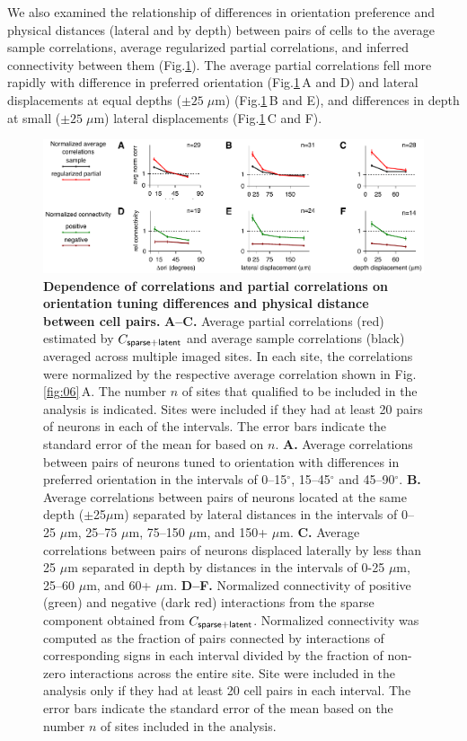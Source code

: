\documentclass[10pt]{article}
\newcommand{\figref}[2]{Fig.\;\ref{fig:#1}\,#2}
\begin{document}
We also examined the relationship of differences in orientation preference and physical distances (lateral and by depth) between pairs of cells to the average sample correlations, average regularized partial correlations, and inferred connectivity between them (Fig.\;\ref{fig:07}). The average partial correlations fell more rapidly with difference in preferred orientation (\figref{07}{A and D}) and lateral displacements at equal depths ($\pm 25\;\mu$m) (\figref{07}{B and E}), and differences in depth at small ($\pm 25\;\mu$m) lateral displacements (\figref{07}{C and F}).

\begin{figure}[!ht]
    \begin{center}
        \includegraphics{./figures/Figure07.pdf}
    \end{center}
    \caption{{\bf Dependence of correlations and partial correlations on orientation tuning differences and physical distance between cell pairs.}
    {\bf A--C.} Average partial correlations (red) estimated by $C_{\sf sparse+latent}$ and average sample correlations (black) averaged across multiple imaged sites. In each site, the correlations were normalized by the respective average correlation shown in Fig.\;\ref{fig:06}\,A.  The number $n$ of sites that qualified to be included in the analysis is indicated. Sites were included if they had at least 20 pairs of neurons in each of the intervals. The error bars indicate the standard error of the mean for based on $n$.
    {\bf A.} Average correlations between pairs of neurons tuned to orientation with differences in preferred orientation in the intervals of 0--15$^\circ$, 15--45$^\circ$ and 45--90$^\circ$. 
    {\bf B.} Average correlations between pairs of neurons located at the same depth ($\pm$25$\mu$m) separated by lateral distances in the intervals of 0--25 $\mu$m, 25--75 $\mu$m, 75--150 $\mu$m, and 150+ $\mu$m.
    {\bf C.} Average correlations between pairs of neurons displaced laterally by less than 25 $\mu$m separated in depth by distances in the intervals of 0-25 $\mu$m, 25--60 $\mu$m, and 60+ $\mu$m.
    {\bf D--F.} Normalized connectivity of positive (green) and negative (dark red) interactions from the sparse component obtained from $C_{\sf sparse+latent}$. Normalized connectivity was computed as the fraction of pairs connected by interactions of corresponding signs in each interval divided by the fraction of non-zero interactions across the entire site. Site were included in the analysis only if they had at least 20 cell pairs in each interval. The error bars indicate the standard error of the mean based on the number $n$ of sites included in the analysis.
}
\label{fig:07}
\end{figure}
\end{document}
